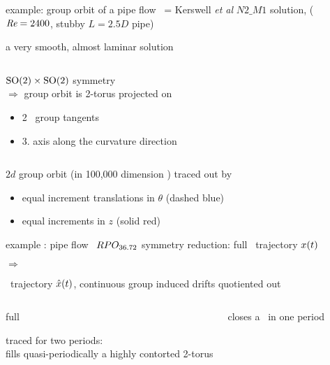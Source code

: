 \begin{frame}{example: group orbit of a pipe flow  \reqv}
{\scriptsize
\slicep\ = Kerswell \emph{et al} $N2\_M1$ solution,
($\textit{Re} =2400$, stubby $L=2.5D$ pipe)
}

\medskip

a very smooth, almost laminar solution

	\begin{columns}[t]
			\begin{exampleblock}
{$\textrm{SO}(2)\times\textrm{SO}(2)$ symmetry
\\
$\Rightarrow$
group orbit is 2-torus}
projected on
  \begin{itemize}
    \item 2 \slicep\ group tangents
    \item 3. axis along the curvature direction
  \end{itemize}
			\end{exampleblock}
\begin{block}
  \centering
\end{block}
	\end{columns}

\bigskip
{\scriptsize
$2d$ group orbit (in 100,000 dimension \textcolor{red}{\statesp}) traced out by
  \begin{itemize}
    \item equal increment translations in $\theta$ (dashed blue)
    \item equal increments in $z$ (solid red)
  \end{itemize}
}
\end{frame}

\begin{frame}{example : pipe flow \rpo\ $RPO_{36.72}$}
symmetry reduction: full \statesp\ trajectory $x(t)$

\begin{center}$\Rightarrow$\end{center}

\reducedsp\ trajectory $\hat{x}(t)$, continuous
group induced drifts quotiented out
  \begin{columns}
\begin{block}{full \statesp}
 \begin{center}
 \end{center}
{\scriptsize traced for two periods:}
\\
{\scriptsize fills quasi-periodically
a highly contorted 2-torus }
\end{block}
\begin{block}{\reducedsp}
 \begin{center}
 \end{center}
{\scriptsize
closes a \po\ in one period}
\end{block}
\end{columns}
\end{frame}

